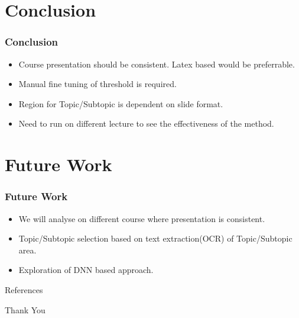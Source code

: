 \documentclass{beamer}
\begin{document}
\section{Conclusion}
\begin{frame}
\frametitle{Conclusion }

	\begin{itemize}
		\item Course presentation should be consistent. Latex based would be preferrable.
		\item Manual fine tuning of threshold is required.
		\item Region for Topic/Subtopic is dependent on slide format.
		\item Need to run on different lecture to see the effectiveness of the method.
	\end{itemize}

\end{frame}


\section{Future Work}
\begin{frame}
\frametitle{Future Work }
\begin{itemize}
	\item We will analyse on different course where presentation is consistent.
	\item Topic/Subtopic selection based on text extraction(OCR) of Topic/Subtopic area. 
	\item Exploration of DNN based approach.
	
\end{itemize}
\end{frame}

\begin{frame}[allowframebreaks]{References}    

\end{frame}


\begin{frame}
\Huge{\centerline{Thank You}}
\end{frame}








\end{document}
